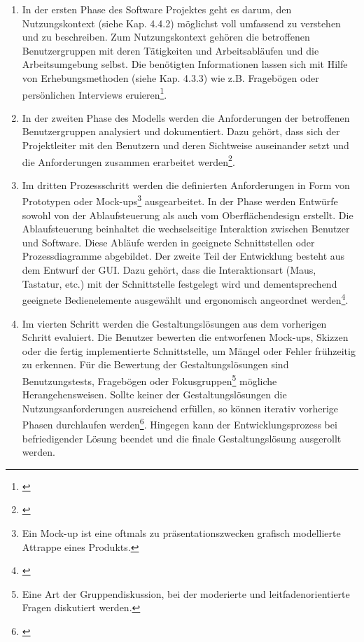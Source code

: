\begin{enumerate}
    \item In der ersten Phase des Software Projektes geht es darum, den Nutzungskontext (siehe Kap. 4.4.2) möglichst voll umfassend zu verstehen und zu beschreiben. Zum Nutzungskontext gehören die betroffenen Benutzergruppen mit deren Tätigkeiten und Arbeitsabläufen und die Arbeitsumgebung selbst. Die benötigten Informationen lassen sich mit Hilfe von Erhebungsmethoden (siehe Kap. 4.3.3) wie z.B. Fragebögen oder persönlichen Interviews eruieren\footnote{\cite[vgl.][28\psq]{Ecker2016}}.
    \item In der zweiten Phase des Modells werden die Anforderungen der betroffenen Benutzergruppen analysiert und dokumentiert. Dazu gehört, dass sich der Projektleiter mit den Benutzern und deren Sichtweise auseinander setzt und die Anforderungen zusammen erarbeitet werden\footnote{\cite[vgl.][30\psq]{Ecker2016}}.
    \item Im dritten Prozessschritt werden die definierten Anforderungen in Form von Prototypen oder Mock-ups\footnote{Ein Mock-up ist eine oftmals zu präsentationszwecken grafisch modellierte Attrappe eines Produkts.} ausgearbeitet. In der Phase werden Entwürfe sowohl von der Ablaufsteuerung als auch vom Oberflächendesign erstellt. Die Ablaufsteuerung beinhaltet die wechselseitige Interaktion zwischen Benutzer und Software. Diese Abläufe werden in geeignete Schnittstellen oder Prozessdiagramme abgebildet. Der zweite Teil der Entwicklung besteht aus dem Entwurf der \gls{GUI}. Dazu gehört, dass die Interaktionsart (Maus, Tastatur, etc.) mit der Schnittstelle festgelegt wird und dementsprechend geeignete Bedienelemente ausgewählt und ergonomisch angeordnet werden\footnote{\cite[vgl.][33\psq]{Ecker2016}}.
    \item Im vierten Schritt werden die Gestaltungslösungen aus dem vorherigen Schritt evaluiert. Die Benutzer bewerten die entworfenen Mock-ups, Skizzen oder die fertig implementierte Schnittstelle, um Mängel oder Fehler frühzeitig zu erkennen. Für die Bewertung der Gestaltungslösungen sind Benutzungstests, Fragebögen oder Fokusgruppen\footnote{Eine Art der Gruppendiskussion, bei der moderierte und leitfadenorientierte Fragen diskutiert werden.} mögliche Herangehensweisen. Sollte keiner der Gestaltungslösungen die Nutzungsanforderungen ausreichend erfüllen, so können iterativ vorherige Phasen durchlaufen werden\footnote{\cite[vgl.][34\psq]{Ecker2016}}. Hingegen kann der Entwicklungsprozess bei befriedigender Lösung beendet und die finale Gestaltungslösung ausgerollt werden.
\end{enumerate}

